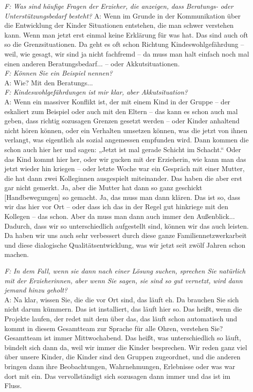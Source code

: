\begin{linenumbers*}
\emph{F: Was sind häufige Fragen der Erzieher, die anzeigen, dass Beratungs- oder Unterstützungsbedarf besteht?}
A: Wenn im Grunde in der Kommunikation über die Entwicklung der Kinder Situationen entstehen, die man schwer verstehen kann. Wenn man jetzt erst einmal keine Erklärung für was hat. Das sind auch oft so die Grenzsituationen. Da geht es oft schon Richtung Kindeswohlgefährdung -- weil, wie gesagt, wir sind ja nicht fachfremd -- da muss man halt einfach noch mal einen anderen Beratungsbedarf... -- oder Akkutsituationen.\\ 
\emph{F: Können Sie ein Beispiel nennen?}\\
A: Wie? Mit den Beratungs...\\
\emph{F: Kindeswohlgefährdungen ist mir klar, aber Akkutsituation?}\\
A: Wenn ein massiver Konflikt ist, der mit einem Kind in der Gruppe -- der
eskaliert zum Beispiel oder auch mit den Eltern -- das kann es schon auch mal
geben, dass richtig sozusagen Grenzen gesetzt werden -- oder Kinder anhaltend
nicht hören können, oder ein Verhalten umsetzen können, was die jetzt von ihnen
verlangt, was eigentlich als sozial angemessen empfunden wird. Dann kommen die
schon auch hier her und sagen: „Jetzt ist mal gerade Schicht im Schacht.“ Oder
das Kind kommt hier her, oder wir gucken mit der Erzieherin, wie kann man das
jetzt wieder hin kriegen -- oder letzte Woche war ein Gespräch mit einer Mutter,
die hat dann zwei Kolleginnen ausgespielt miteinander. Das haben die aber erst
gar nicht gemerkt. Ja, aber die Mutter hat dann so ganz geschickt
{[Handbewegungen]} so gemacht. Ja, das muss man dann klären. Das ist so, dass wir das hier vor Ort -- oder dass ich das in der Regel gut hinkriege mit den Kollegen -- das schon. Aber da muss man dann auch immer den Außenblick... Dadurch, dass wir so unterschiedlich aufgestellt sind, können wir das auch leisten. Da haben wir uns auch sehr verbessert durch diese ganze Familiennetzwerkarbeit und diese dialogische Qualitätsentwicklung, was wir jetzt seit zwölf Jahren schon machen. 

\emph{F: In dem Fall, wenn sie dann nach einer Lösung suchen, sprechen Sie natürlich mit der Erzieherinnen, aber wenn Sie sagen, sie sind so gut vernetzt, wird dann jemand hinzu geholt?}\\
A: Na klar, wissen Sie, die die vor Ort sind, das läuft eh. Da brauchen Sie sich nicht darum kümmern. Das ist installiert, das läuft hier so. Das heißt, wenn die Projekte laufen, der redet mit dem über das, das läuft schon automatisch und kommt in diesem Gesamtteam zur Sprache für alle Ohren, verstehen Sie?\\
Gesamtteam ist immer Mittwochabend. Das heißt, was unterschiedlich so läuft, bündelt sich dann da, weil wir immer die Kinder besprechen. Wir reden ganz viel über unsere Kinder, die Kinder sind den Gruppen zugeordnet, und die anderen bringen dann ihre Beobachtungen, Wahrnehmungen, Erlebnisse oder was war dort mit ein. Das vervollständigt sich sozusagen dann immer und das ist im Fluss.


\end{linenumbers*}
